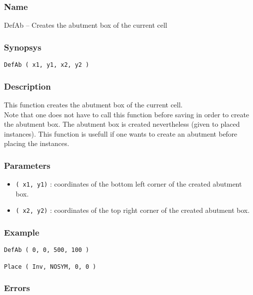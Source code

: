 \subsubsection{Name}

DefAb -- Creates the abutment box of the current cell

\subsubsection{Synopsys}
      
\begin{verbatim}
DefAb ( x1, y1, x2, y2 )
\end{verbatim}
    
\subsubsection{Description}

This function creates the abutment box of the current cell.\\
         
\indent Note that one does not have to call this function before saving in order to create the abutment box. The abutment box is created nevertheless (given to placed instances). This function is usefull if one wants to create an abutment before placing the instances.

\subsubsection{Parameters}

\begin{itemize}
    \item \verb-( x1, y1)- : coordinates of the bottom left corner of the created abutment box.
    \item \verb-( x2, y2)- : coordinates of the top right corner of the created abutment box.
\end{itemize}
    
\subsubsection{Example}

\begin{verbatim}
DefAb ( 0, 0, 500, 100 )
    
Place ( Inv, NOSYM, 0, 0 )
\end{verbatim}

\subsubsection{Errors}
    
